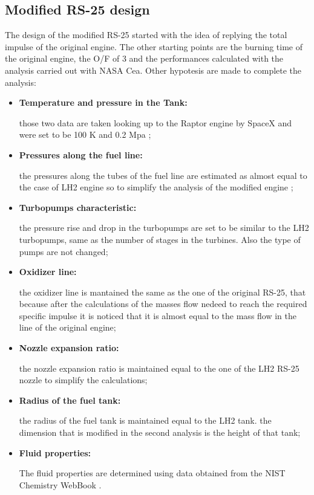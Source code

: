 \subsection{Modified RS-25 design}
The design of the modified RS-25 started with the idea of replying the total impulse of the original engine.
The other starting points are the burning time of the original engine, the O/F of 3 and the performances calculated with the analysis carried out with NASA Cea. Other hypotesis are made to complete the analysis:
\begin{itemize}
    \item\textbf{Temperature and pressure in the Tank:}

    those two data are taken looking up to the Raptor engine by SpaceX and were set to be 100 K and 0.2 Mpa ;

    \item\textbf{Pressures along the fuel line:} 
    
    the pressures along the tubes of the fuel line are estimated as almost equal to the case of LH2 engine so to simplify the analysis of the modified engine ;

    \item\textbf{Turbopumps characteristic:}
    
    the pressure rise and drop in the turbopumps are set to be similar to the LH2 turbopumps, same as the number of stages in the turbines. Also the type of pumps are not changed; 
    \item \textbf{Oxidizer line:}
    
    the oxidizer line is mantained the same as the one of the original RS-25, that because after the calculations of the masses flow nedeed to reach the required specific impulse it is noticed that it is almost equal to the mass flow in the line of the original engine;
    \item\textbf{Nozzle expansion ratio:}

    the nozzle expansion ratio is maintained equal to the one of the LH2 RS-25 nozzle to simplify the calculations;

    \item\textbf{Radius of the fuel tank:}

    the radius of the fuel tank is maintained equal to the LH2 tank. the dimension that is modified in the second analysis is the height of that tank;

    \item\textbf{Fluid properties: }

   The fluid properties are determined using data obtained from the NIST Chemistry WebBook \cite{nist}.
\end{itemize}

